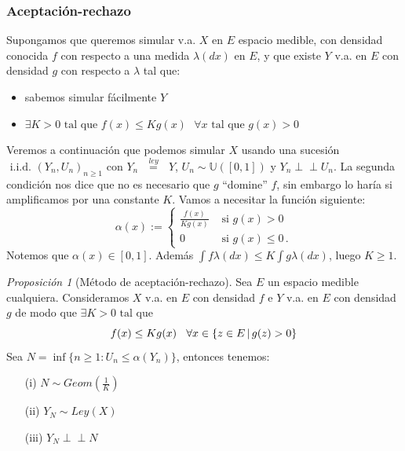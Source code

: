 \documentclass[letterpaper,11pt]{article} %
\def\espacio{\hspace{.25cm}\,}
\theoremstyle{defbreak}
\theoremstyle{propbreak}
\theoremstyle{remark}
\theoremstyle{break}
\newtheorem{proposition}{Proposición}[subsection]
\def\unif{\mathbb{U}([0,1])}
\newcommand{\indep}{\perp \!\!\! \perp}
\def\iid{\mbox{ i.i.d. }}
\def\tq{\mbox{ tal que }}
\def\igualley{\mbox{ }\overset{ley}{=}\mbox{ }}
\begin{document}
\subsubsection{Aceptación-rechazo}
\label{metgen}
Supongamos que queremos simular v.a. $X$ en $E$ espacio medible, con densidad conocida $f$ con respecto a una medida $\lambda(dx)$ en $E$, y que existe $Y$ v.a. en $E$ con densidad $g$ con respecto a $\lambda$ tal que:
\begin{itemize}
    \item sabemos simular fácilmente $Y$
    \item $\exists K>0 \tq f(x)\leq Kg(x)\mbox{ } \forall x \tq g(x)>0$
\end{itemize}
Veremos a continuación que podemos simular $X$ usando una sucesión $\iid (Y_n,U_n)_{n\geq 1}$ con $Y_n\igualley Y$, $U_n\sim\unif$ y $Y_n\indep U_n$. La segunda condición nos dice que no es necesario que $g$ ``domine'' $f$, sin embargo lo haría si amplificamos por una constante $K$.
\newp Vamos a necesitar la función siguiente:  %
$$ \alpha(x) := \begin{cases} 
    \displaystyle\frac{f(x)}{Kg(x)}  & \mbox{ si }g(x)>0\\
    0 & \mbox{ si }g(x)\leq0  \, .
\end{cases}$$
Notemos que $\alpha(x)\in[0,1]$. Además $\displaystyle\int f \lambda(dx)\leq K\int g\lambda(dx)$, luego $K\geq 1$.
\begin{proposition}[Método de aceptación-rechazo]
Sea $E$ un espacio medible cualquiera. Consideramos $X$ v.a. en $E$ con densidad $f$ e $Y$ v.a. en $E$ con densidad $g$ de modo que $\exists K>0 \tq $
$$f(x)\leq Kg(x) \espacio \forall x\in \{z\in E \,|\,g(z)>0 \}$$
\newline Sea $N=\inf\{n\geq 1:U_n\leq \alpha(Y_n)\}$, entonces tenemos:
\begin{itemize}
    \item[(i)] $N\sim Geom(\frac{1}{K})$
    \item[(ii)] $Y_N\sim Ley(X)$
    \item[(iii)] $Y_N\indep N$
\end{itemize}
\end{proposition}
\end{document}
